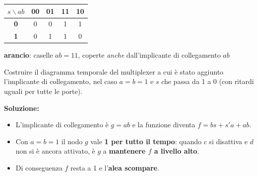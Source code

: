 \documentclass[12pt, a4paper]{article}
\begin{document}
\begin{center}
\renewcommand{\arraystretch}{1.25}
\begin{tabular}[t]{|c|c|c|c|c|}
\hline
\colorbox{gray!25}{\color{black}$s\backslash ab$} & \colorbox{gray!25}{\color{black}\textbf{00}} & \colorbox{gray!25}{\color{black}\textbf{01}} & \colorbox{gray!25}{\color{black}\textbf{11}} & \colorbox{gray!25}{\color{black}\textbf{10}} \\ \hline
\colorbox{gray!25}{\color{black}\textbf{0}} & 0 & 0 & \colorbox{orange!55}{\color{black}1} & \colorbox{green!30}{\color{black}1} \\ \hline
\colorbox{gray!25}{\color{black}\textbf{1}} & 0 & \colorbox{yellow!55}{\color{black}1} & \colorbox{orange!55}{\color{black}1} & 0 \\ \hline
\end{tabular}
\end{center}
\begin{center}
\textcolor{orange!90!black}{\textbf{arancio}}: caselle $ab = 11$, coperte \emph{anche} dall'implicante di collegamento $ab$
\end{center}

\begin{tcolorbox}[colback=lightergray!10, colframe=tocsec, title=\textbf{Esercizio: diagramma temporale del multiplexer senza alea}]
Costruire il diagramma temporale del multiplexer a cui è stato aggiunto l'implicante di collegamento, nel caso $a = b = 1$ e $s$ che passa da 1 a 0 (con ritardi uguali per tutte le porte).
\end{tcolorbox}

\textbf{Soluzione:}
\begin{itemize}
    \item L'implicante di collegamento è $g = ab$ e la funzione diventa $f = bs + s'a + ab$.
    \item Con $a = b = 1$ il nodo $g$ vale \textbf{1 per tutto il tempo}: quando $c$ si disattiva e $d$ non si è ancora attivato, è $g$ a \textbf{mantenere $f$ a livello alto}.
    \item Di conseguenza $f$ resta a 1 e l'\textbf{alea scompare}.
\end{itemize}
\end{document}
